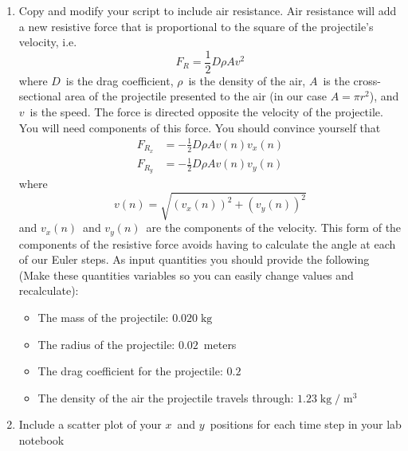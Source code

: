 \documentclass{book}
\begin{document}
\begin{enumerate}
\item {\small Copy and modify your script to include air resistance. Air
resistance will add a new resistive force that is proportional to the square
of the projectile's velocity, i.e. } \[
F_{R}=\frac{1}{2}D\rho Av^{2}
\]
{\small where }$D${\small \ is the drag coefficient, }$\rho${\small \ is the
density of the air, }$A${\small \ is the cross-sectional area of the
projectile presented to the air (in our case }$A=\pi r^{2}${\small ), and }$v
${\small \ is the speed. The force is directed opposite the velocity of the
projectile. You will need components of this force. You should convince
yourself that } \begin{align*}
F_{R_{x}}  & =-\frac{1}{2}D\rho Av\left(  n\right)  v_{x}\left(  n\right) \\
F_{R_{y}}  & =-\frac{1}{2}D\rho Av\left(  n\right)  v_{y}\left(  n\right)
\end{align*}
{\small where } \[
v\left(  n\right)  =\sqrt{\left(  v_{x}\left(  n\right)  \right)  ^{2}+\left(
v_{y}\left(  n\right)  \right)  ^{2}}
\]
{\small and }$v_{x}\left(  n\right)  ${\small \ and }$v_{y}\left(  n\right)
${\small \ are the components of the velocity. This form of the components of
the resistive force avoids having to calculate the angle at each of our Euler
steps. As input quantities you should provide the following (Make these
quantities variables so you can easily change values and recalculate):}

\begin{itemize}
\item {\small The mass of the projectile:}
$0.020 \operatorname{kg} $

\item {\small The radius of the projectile:}
$0.02${\small \ meters}

\item {\small The drag coefficient for the projectile:}
$0.2$

\item {\small The density of the air the projectile travels through:}
$1.23 \operatorname{kg} / \operatorname{m} ^{3}$
\end{itemize}

\item {\small Include a scatter plot of your }$x${\small \ and } $y${\small \ positions for each time step in your lab notebook}
\end{enumerate}
\end{document}
